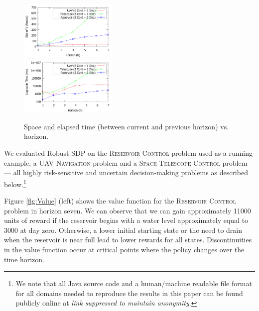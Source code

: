 \begin{figure}[tbp!]
\vspace{-2mm}
\centering

\includegraphics[width=0.42\textwidth]{Figures/Nodes.pdf}\\
\vspace{-2mm}
\includegraphics[width=0.42\textwidth]{Figures/Time.pdf}

\vspace{-2mm}
\caption{\footnotesize Space and elapsed time (between current and previous horizon) vs. horizon.
}
\label{fig:SpaceTime}
\vspace{-4mm}
\end{figure}

\label{sec:results}

We evaluated Robust SDP on the \textsc{Reservoir Control} problem used as a running example,
a \textsc{UAV Navigation} problem  and
a \textsc{Space Telescope Control} problem --- all highly risk-sensitive and uncertain
decision-making problems as described below.\footnote{We 
note that all Java source code and a
human/machine readable file format for all domains needed to reproduce
the results in this paper can be found publicly online at
\emph{link suppressed to maintain anonymity}.} %

Figure \ref{fig:Value} (left) shows the value function for the
\textsc{Reservoir Control} problem in horizon seven. We can observe
that we can gain approximately 11000 units of reward if the reservoir
begins with a water level approximately equal to 3000 at day zero.
Otherwise, a lower initial starting state or the need to drain when
the reservoir is near full lead to lower rewards for all states.
Discontinuities in the value function occur at critical points where
the policy changes over the time horizon.

